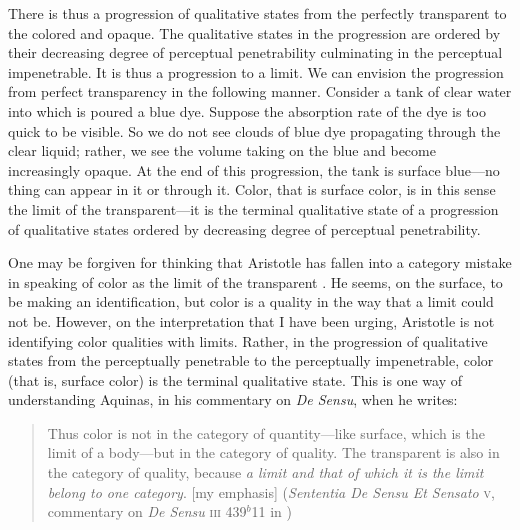 There is thus a progression of qualitative states from the perfectly transparent to the colored and opaque. The qualitative states in the progression are ordered by their decreasing degree of perceptual penetrability culminating in the perceptual impenetrable. It is thus a progression to a limit. We can envision the progression from perfect transparency in the following manner. Consider a tank of clear water into which is poured a blue dye. Suppose the absorption rate of the dye is too quick to be visible. So we do not see clouds of blue dye propagating through the clear liquid; rather, we see the volume taking on the blue and become increasingly opaque. At the end of this progression, the tank is surface blue---no thing can appear in it or through it. Color, that is surface color, is in this sense the limit of the transparent---it is the terminal qualitative state of a progression of qualitative states ordered by decreasing degree of perceptual penetrability.

One may be forgiven for thinking that Aristotle has fallen into a category mistake in speaking of color as the limit of the transparent \citep[65]{Broackes:1999uq}. He seems, on the surface, to be making an identification, but color is a quality in the way that a limit could not be. However, on the interpretation that I have been urging, Aristotle is not identifying color qualities with limits. Rather, in the progression of qualitative states from the perceptually penetrable to the perceptually impenetrable, color (that is, surface color) is the terminal qualitative state. This is one way of understanding Aquinas, in his commentary on \emph{De Sensu}, when he writes:
\begin{quote}
	Thus color is not in the category of quantity---like surface, which is the limit of a body---but in the category of quality. The transparent is also in the category of quality, because \emph{a limit and that of which it is the limit belong to one category}. [my emphasis] (\emph{Sententia De Sensu Et Sensato} \textsc{v}, commentary on \emph{De Sensu} \textsc{iii} 439\( ^{b} \)11 in \citealt{White:2005vn})
\end{quote}

